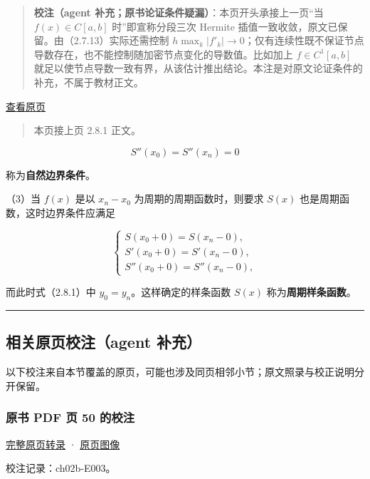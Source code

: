 \documentclass[
  10pt,
  fontset=fandol]{ctexart}
\begin{document}
\begin{quote}
\textbf{校注（agent 补充；原书论证条件疑漏）}：本页开头承接上一页``当 \(f(x)\in C[a,b]\) 时''即宣称分段三次 Hermite 插值一致收敛，原文已保留。由（2.7.13）实际还需控制 \(h\max_k|f'_k|\to0\)；仅有连续性既不保证节点导数存在，也不能控制随加密节点变化的导数值。比如加上 \(f\in C^1[a,b]\) 就足以使节点导数一致有界，从该估计推出结论。本注是对原文论证条件的补充，不属于教材正文。
\end{quote}

\href{../../source-images/pdf-050.jpeg}{查看原页}

\begin{quote}
本页接上页 2.8.1 正文。
\end{quote}

\[S''(x_0)=S''(x_n)=0\tag{2.8.4'}\]

称为\textbf{自然边界条件}。

（3）当 \(f(x)\) 是以 \(x_n-x_0\) 为周期的周期函数时，则要求 \(S(x)\) 也是周期函数，这时边界条件应满足

\[\begin{cases}
S(x_0+0)=S(x_n-0),\\
S'(x_0+0)=S'(x_n-0),\\
S''(x_0+0)=S''(x_n-0),
\end{cases}\tag{2.8.5}\]

而此时式（2.8.1）中 \(y_0=y_n\)。这样确定的样条函数 \(S(x)\) 称为\textbf{周期样条函数}。

\begin{center}\rule{0.5\linewidth}{0.5pt}\end{center}

\subsection{相关原页校注（agent 补充）}\label{ux76f8ux5173ux539fux9875ux6821ux6ce8agent-ux8865ux5145}

以下校注来自本节覆盖的原页，可能也涉及同页相邻小节；原文照录与校正说明分开保留。

\subsubsection{原书 PDF 页 50 的校注}\label{ux539fux4e66-pdf-ux9875-50-ux7684ux6821ux6ce8}

\href{../pages/pdf-050.md}{完整原页转录} · \href{../../source-images/pdf-050.jpeg}{原页图像}

校注记录：ch02b-E003。
\end{document}
